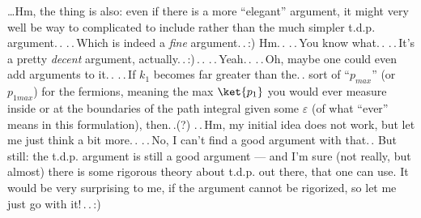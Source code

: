 \documentclass{report}
\begin{document}

\ldots Hm, the thing is also: even if there is a more ``elegant'' argument, it might very well be way to complicated to include rather than the much simpler t.d.p. argument.\,. .\,.\,Which is indeed a \emph{fine} argument.\,.\,:) Hm.\,. %
.\,.\,You know what.\,. .\,.\,It's a pretty \emph{decent} argument, actually.\,.\,:)\,.\,. .\,.\,Yeah.\,. .\,.\,Oh, maybe one could even add arguments to it.\,. %
.\,.\,If $k_1$ becomes far greater than the.\,. sort of ``$p_{max}$'' (or $p_{1 max}$) for the fermions, meaning the max $\ket{p_1}$ you would ever measure inside or at the boundaries of the path integral given some $\varepsilon$ (of what ``ever'' means in this formulation), then.\,.(?) %
.\,.\,Hm, my initial idea does not work, but let me just think a bit more.\,. .\,.\,No, I can't find a good argument with that.\,. %
But still: the t.d.p. argument is still a good argument --- and I'm sure (not really, but almost) there is some rigorous theory about t.d.p. out there, that one can use. It would be very surprising to me, if the argument cannot be rigorized, so let me just go with it!\,.\,.\,:) %
\end{document}
